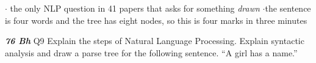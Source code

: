 
{\color{sub}\footnotesize {}  \gap$\cdot$\gap
the only NLP question in 41 papers that asks for something \emph{drawn}
\gap$\cdot$\gap the sentence is four words and the tree has eight nodes, so this is four
marks in three minutes}

\begin{asked}{\textbf{\textit{76 Bh}} \textperiodcentered{} Q9 \textperiodcentered{} }
Explain the steps of Natural Language Processing. Explain syntactic analysis and draw a
parse tree for the following sentence. ``A girl has a name.''
\end{asked}

